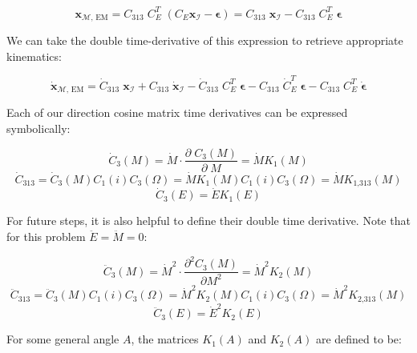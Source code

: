 \documentclass[]{article}
\newcommand{\pd}[2]{\frac{\partial\;#1}{\partial\;#2}}
\begin{document}
	\begin{equation}
		\mathbf{x}_{\mathcal{M}\text{, EM}} = C_\text{313} \; C_E^T \; \left( C_E \mathbf{x}_\mathcal{I} - \boldsymbol{\epsilon} \right) = C_\text{313} \; \mathbf{x}_\mathcal{I} - C_\text{313} \; C_E^T \; \boldsymbol{\epsilon}
	\end{equation}
	
	We can take the double time-derivative of this expression to retrieve appropriate kinematics:
	
	\begin{equation}
		\dot{\mathbf{x}}_{\mathcal{M}\text{, EM}} = \dot{C}_\text{313} \; \mathbf{x}_\mathcal{I} + C_\text{313} \; \dot{\mathbf{x}}_\mathcal{I} - \dot{C}_\text{313} \; C_E^T \; \boldsymbol{\epsilon} - C_\text{313} \; \dot{C}_E^T \; \boldsymbol{\epsilon} - C_\text{313} \; C_E^T \; \dot{\boldsymbol{\epsilon}}
	\end{equation}
	
	Each of our direction cosine matrix time derivatives can be expressed symbolically:
	
	\begin{equation}
		\dot{C}_3(M) = \dot{M} \cdot \pd{C_3(M)}{M} = \dot{M} K_1(M)
	\end{equation}
	\begin{equation}
		\dot{C}_\text{313} = \dot{C}_3(M) C_1(i) C_3(\Omega) = \dot{M} K_1(M) C_1(i) C_3(\Omega) = \dot{M} K_\text{1,313}(M)
	\end{equation}
	\begin{equation}
		\dot{C}_3(E) = \dot{E} K_1(E)
	\end{equation}
	
	For future steps, it is also helpful to define their double time derivative.  Note that for this problem $\ddot{E} = \ddot{M} = 0$:
	
	\begin{equation}
		\ddot{C}_3(M) = \dot{M}^2 \cdot \frac{\partial^2 C_3(M)}{\partial M^2} = \dot{M}^2 K_2(M)
	\end{equation}
	\begin{equation}
	\ddot{C}_\text{313} = \ddot{C}_3(M) C_1(i) C_3(\Omega) = \dot{M}^2 K_2(M) C_1(i) C_3(\Omega) = \dot{M}^2 K_\text{2,313}(M)
	\end{equation}
	\begin{equation}
		\ddot{C}_3(E) = \dot{E}^2 K_2(E)
	\end{equation}
	
	For some general angle $A$, the matrices $K_1(A)$ and $K_2(A)$ are defined to be:
	
\end{document}
